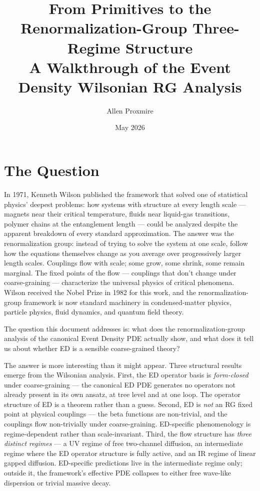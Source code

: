 \documentclass[11pt,a4paper]{article}
\title{\vspace{-1cm}\Large\bfseries From Primitives to the Renormalization-Group Three-Regime Structure\\[6pt]
\large\mdseries A Walkthrough of the Event Density Wilsonian RG Analysis}
\author{Allen Proxmire}
\date{May 2026}
\begin{document}
\maketitle

\section{The Question}

In 1971, Kenneth Wilson published the framework that solved one of statistical physics' deepest problems: how systems with structure at every length scale --- magnets near their critical temperature, fluids near liquid-gas transitions, polymer chains at the entanglement length --- could be analyzed despite the apparent breakdown of every standard approximation. The answer was the renormalization group: instead of trying to solve the system at one scale, follow how the equations themselves change as you average over progressively larger length scales. Couplings flow with scale; some grow, some shrink, some remain marginal. The fixed points of the flow --- couplings that don't change under coarse-graining --- characterize the universal physics of critical phenomena. Wilson received the Nobel Prize in 1982 for this work, and the renormalization-group framework is now standard machinery in condensed-matter physics, particle physics, fluid dynamics, and quantum field theory.

The question this document addresses is: what does the renormalization-group analysis of the canonical Event Density PDE actually show, and what does it tell us about whether ED is a sensible coarse-grained theory?

The answer is more interesting than it might appear. Three structural results emerge from the Wilsonian analysis. First, the ED operator basis is \emph{form-closed} under coarse-graining --- the canonical ED PDE generates no operators not already present in its own ansatz, at tree level and at one loop. The operator structure of ED is a theorem rather than a guess. Second, ED is \emph{not} an RG fixed point at physical couplings --- the beta functions are non-trivial, and the couplings flow non-trivially under coarse-graining. ED-specific phenomenology is regime-dependent rather than scale-invariant. Third, the flow structure has \emph{three distinct regimes} --- a UV regime of free two-channel diffusion, an intermediate regime where the ED operator structure is fully active, and an IR regime of linear gapped diffusion. ED-specific predictions live in the intermediate regime only; outside it, the framework's effective PDE collapses to either free wave-like dispersion or trivial massive decay.
\end{document}
